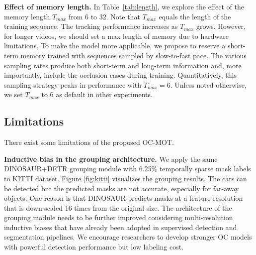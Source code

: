 \noindent\textbf{Effect of memory length.} In Table~\ref{tab:length}, we explore the effect of the memory length $T_{max}$ from 6 to 32. Note that $T_{max}$ equals the length of the training sequence. The tracking performance increases as $T_{max}$ grows. However, for longer videos, we should set a max length of memory due to hardware limitations. To make the model more applicable, we propose to reserve a short-term memory trained with sequences sampled by slow-to-fast pace. The various sampling rates produce both short-term and long-term information and, more importantly, include the occlusion cases during training. Quantitatively, this sampling strategy peaks in performance with $T_{max}=6$. Unless noted otherwise, we set $T_{max}$ to 6 as default in other experiments.

\begin{table}[!ht]
\centering
{}
\vspace{+0.3cm}
\caption{Ablation on the memory length on CATER.}
\label{tab:length}
\end{table}







\subsection{Limitations}


There exist some limitations of the proposed OC-MOT.

\vspace{+1mm}
\noindent\textbf{Inductive bias in the grouping architecture.} We apply the same DINOSAUR+DETR grouping module with 6.25\% temporally sparse mask labels to KITTI dataset. Figure \ref{fig:kitti} visualizes the grouping results. The cars can be detected but the predicted masks are not accurate, especially for far-away objects.
One reason is that DINOSAUR predicts masks at a feature resolution that is down-scaled 16 times from the original size. The architecture of the grouping module needs to be further improved considering multi-resolution inductive biases that have already been adopted in  supervised detection and segmentation pipelines. %
We encourage researchers to develop stronger OC models with powerful detection performance but low labeling cost.


